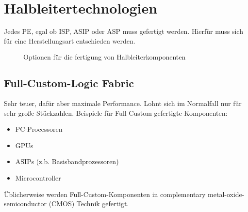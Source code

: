 \chapter{Halbleitertechnologien}
Jedes PE, egal ob ISP, ASIP oder ASP muss gefertigt werden. Hierfür muss sich für eine Herstellungsart entschieden werden.
\begin{figure}[H]
    \centering
    \caption{Optionen für die fertigung von Halbleiterkomponenten}
\end{figure}

\section{Full-Custom-Logic Fabric}
Sehr teuer, dafür aber maximale Performance. 
Lohnt sich im Normalfall nur für sehr große Stückzahlen.
Beispiele für Full-Custom gefertigte Komponenten:
\begin{itemize}
    \item PC-Processoren
    \item GPUs
    \item ASIPs (z.b. Basisbandprozessoren)
    \item Microcontroller
\end{itemize}
Üblicherweise werden Full-Custom-Komponenten in \glqq{}complementary metal-oxide-semiconductor\grqq{} (CMOS) Technik gefertigt.

